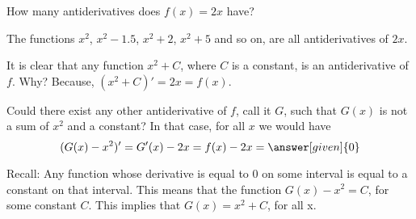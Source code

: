 \documentclass{ximera}
\begin{document}
\begin{question}
  How many antiderivatives does $f(x) = 2x$ have?
  \begin{prompt}
  \begin{multipleChoice}
  \end{multipleChoice}
  \end{prompt}
  \begin{feedback}
   \begin{image}
\end{image}
    The functions $x^2$, $x^2-1.5$, $x^2+2$, $x^2+5$ and so on, are all
    antiderivatives of $2x$.

     It is clear that any function $x^2+C$, where $C$ is a constant, is an antiderivative of $f$. Why?
    Because, $(x^2+C)'=2x=f(x)$.

     Could there exist any other antiderivative of $f$, call it $G$, such that $G(x)$ is not a sum of $x^2$ and a constant?
    In that case, for all $x$  we would have
  \[
  (G(x)-x^2)' = G'(x)-2x=f(x)-2x= \answer[given]{0}
\]
  \end{feedback}
  Recall: Any function whose derivative is equal to $0$ on some
  interval is equal to a constant on that interval.  This means that
  the function $G(x)-x^2=C$, for some constant $C$. This implies that
  $G(x)=x^2+C$, for all x.
\end{question}
\end{document}
